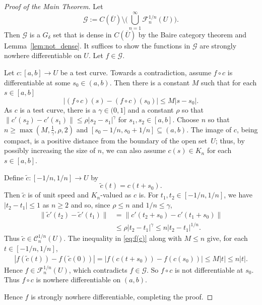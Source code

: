 \documentclass[12pt]{amsart}
\numberwithin{equation}{section}
\newcommand{\cn}{\colon}                %
\theoremstyle{definition}
\theoremstyle{remark}
\begin{document}
\begin{proof}[Proof of the Main Theorem]
Let 
\begin{equation*}
\mathcal G :=  C(\overline U) \setminus 
 \bigg(\bigcup_{n=1}^\infty \mathcal F_n^{1/n} (U)\bigg).
\end{equation*}
Then $\mathcal G$ is a  $G_\delta$ 
set that is dense in  $C(\overline U)$ by
the Baire category theorem and Lemma~\ref{lem:not_dense}.
It suffices to   show  the functions in $\mathcal G$
are strongly nowhere differentiable on $U$.
Let $f\in \mathcal G$.


Let $c\cn [a,b]\to U$ be a test curve.
Towards a  contradiction,
assume $f\circ c$ is  differentiable at some  $s_0\in (a,b)$.
%
Then there
is a constant $M$ such that for each $s\in [a,b]$
\begin{equation}\label{eq:f(c)}
| (f \circ c) (s) - (f\circ c)(s_0)| \le M |s-s_0|.
\end{equation}
As $c$ is a test curve,
there is a  $\gamma\in (0,1]$ and a constant $\rho$ so that
$\| c'(s_2) - c'(s_1)\| \le \rho |s_2- s_1|^\gamma$
for $s_1, s_2 \in [a,b]$.
Choose $n$ so that $n\geq\max(M,\tfrac{1}{\gamma},\rho,2)$
and   $[s_0-1/n,s_0+1/n]\subseteq (a,b)$.
The image of $c$, being compact, is a positive distance
from the boundary of the open set~$U$;
thus, by possibly increasing the size of $n$, we can also assume
$c(s)\in K_n$ for each  $s\in [a,b]$.

Define $\tilde c \cn [-1/n,1/n] \to U$ by 
$$
\tilde c(t) = c(t + s_0). 
$$
Then $\tilde c$ is of unit speed
and $K_n$-valued
as
$c$ is.
%
For  $t_1, t_2\in [-1/n,1/n]$,
we have  $| t_2-t_1 | \leq 1$ as $n\geq 2$ and so,
since $\rho \leq n$ and $1/n \leq \gamma$,
\begin{align*}
  \| \tilde c'(t_2) - \tilde c'(t_1)\|
   & = \| c'(t_2 + s_0)   - c'(t_1 + s_0 )\|\\
      &\le \rho |t_2-t_1|^\gamma \le n |t_2-t_1|^{1/n}.
\end{align*} 
Thus $\tilde c \in \mathcal C_n^{1/n} (U)$.
The inequality in \eqref{eq:f(c)}
along with $M\le n$ give,
for each $t\in [-1/n,1/n]$,
\begin{align*}
|f(\tilde c(t)) - f(\tilde c(0))|
 = |f(c(t+s_0)) - f(c(s_0))| 
 \le M|t| \le n|t| .
\end{align*} 
Hence  $f\in \mathcal F_n^{1/n} (U)$, which contradicts  $f \in \mathcal G$.
So $f\circ c$ is  not differentiable at $s_0$.
Thus $f\circ c$ is nowhere differentiable on $(a,b)$. 

Hence  $f$ is strongly nowhere differentiable, completing the proof. 
\end{proof}
\end{document}
